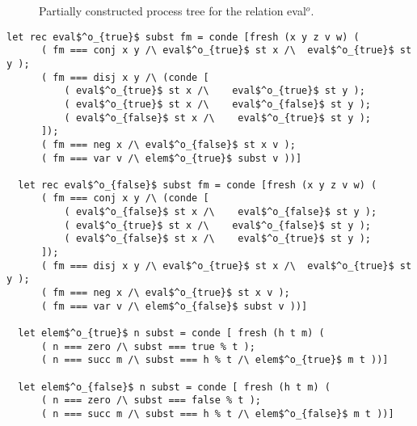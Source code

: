 \begin{figure}[!t]
  \centering
  \begin{minipage}{0.95\textwidth}
    
  \end{minipage}
  \caption{Partially constructed process tree for the relation eval$^o$.}
  \label{fig:evalTree}
\end{figure}

\begin{figure*}[!t]
  \centering
  \begin{minipage}{0.95\textwidth}
    \begin{lstlisting}[label={eval:whole}, caption={Specialized evaluator of propositional formulas}, captionpos=b, frame=tb]
  let rec eval$^o_{true}$ subst fm = conde [fresh (x y z v w) (
      ( fm === conj x y /\ eval$^o_{true}$ st x /\  eval$^o_{true}$ st y );
      ( fm === disj x y /\ (conde [
          ( eval$^o_{true}$ st x /\    eval$^o_{true}$ st y );
          ( eval$^o_{true}$ st x /\    eval$^o_{false}$ st y );
          ( eval$^o_{false}$ st x /\    eval$^o_{true}$ st y );
      ]);
      ( fm === neg x /\ eval$^o_{false}$ st x v );
      ( fm === var v /\ elem$^o_{true}$ subst v ))]

  let rec eval$^o_{false}$ subst fm = conde [fresh (x y z v w) (
      ( fm === conj x y /\ (conde [
          ( eval$^o_{false}$ st x /\    eval$^o_{false}$ st y );
          ( eval$^o_{true}$ st x /\    eval$^o_{false}$ st y );
          ( eval$^o_{false}$ st x /\    eval$^o_{true}$ st y );
      ]);
      ( fm === disj x y /\ eval$^o_{true}$ st x /\  eval$^o_{true}$ st y );
      ( fm === neg x /\ eval$^o_{true}$ st x v );
      ( fm === var v /\ elem$^o_{false}$ subst v ))]

  let elem$^o_{true}$ n subst = conde [ fresh (h t m) (
      ( n === zero /\ subst === true % t );
      ( n === succ m /\ subst === h % t /\ elem$^o_{true}$ m t ))]

  let elem$^o_{false}$ n subst = conde [ fresh (h t m) (
      ( n === zero /\ subst === false % t );
      ( n === succ m /\ subst === h % t /\ elem$^o_{false}$ m t ))]


    \end{lstlisting}
  \end{minipage}
\end{figure*}